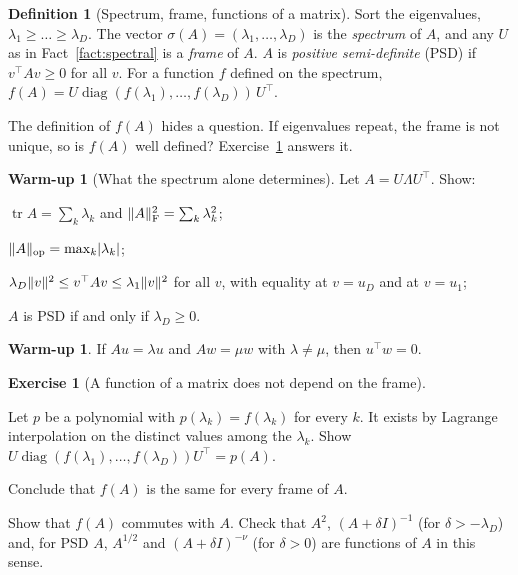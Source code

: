 \documentclass[11pt,a4paper]{article}
\DeclareMathOperator{\tr}{tr}
\DeclareMathOperator{\diag}{diag}
\DeclarePairedDelimiter{\norm}{\lVert}{\rVert}
\DeclarePairedDelimiter{\abs}{\lvert}{\rvert}
\newcommand{\op}{\mathrm{op}}
\newcommand{\F}{\mathrm{F}}
\theoremstyle{plain}
\theoremstyle{definition}
\newtheorem{definition}[proposition]{Definition}
\newtheorem{warmup}[proposition]{Warm-up}
\newtheorem{exercise}[proposition]{Exercise}
\theoremstyle{remark}
\begin{document}
\begin{definition}[Spectrum, frame, functions of a matrix]\label{def:frame}
Sort the eigenvalues, $\lambda_1\ge\dots\ge\lambda_D$. The vector $\sigma(A)=(\lambda_1,\dots,\lambda_D)$ is the
\emph{spectrum} of $A$, and any $U$ as in Fact~\ref{fact:spectral} is a \emph{frame} of $A$. $A$ is \emph{positive
semi-definite} (PSD) if $v^\top Av\ge0$ for all $v$. For a function $f$ defined on the spectrum,
$f(A)=U\diag(f(\lambda_1),\dots,f(\lambda_D))\,U^\top$.
\end{definition}

The definition of $f(A)$ hides a question. If eigenvalues repeat, the frame is not unique, so is $f(A)$ well defined?
Exercise~\ref{ex:fwelldef} answers it.

\begin{warmup}[What the spectrum alone determines]\label{wu:spectrum}
Let $A=U\Lambda U^\top$. Show:
\begin{steps}
\item $\tr A=\sum_k\lambda_k$ and $\norm{A}_\F^2=\sum_k\lambda_k^2$;
\item $\norm{A}_\op=\max_k\abs{\lambda_k}$;
\item $\lambda_D\norm{v}^2\le v^\top Av\le\lambda_1\norm{v}^2$ for all $v$, with equality at $v=u_D$ and at $v=u_1$;
\item $A$ is PSD if and only if $\lambda_D\ge0$.
\end{steps}
\end{warmup}

\begin{warmup}\label{wu:orthogonal}
If $Au=\lambda u$ and $Aw=\mu w$ with $\lambda\ne\mu$, then $u^\top w=0$.
\end{warmup}

\begin{exercise}[A function of a matrix does not depend on the frame]\label{ex:fwelldef}
\begin{steps}
\item Let $p$ be a polynomial with $p(\lambda_k)=f(\lambda_k)$ for every $k$. It exists by Lagrange interpolation
  on the distinct values among the $\lambda_k$. Show $U\diag(f(\lambda_1),\dots,f(\lambda_D))U^\top=p(A)$.
\item Conclude that $f(A)$ is the same for every frame of $A$.
\item Show that $f(A)$ commutes with $A$. Check that $A^2$, $(A+\delta I)^{-1}$ (for $\delta>-\lambda_D$) and, for
  PSD $A$, $A^{1/2}$ and $(A+\delta I)^{-\nu}$ (for $\delta>0$) are functions of $A$ in this sense.
\end{steps}
\end{exercise}
\end{document}
